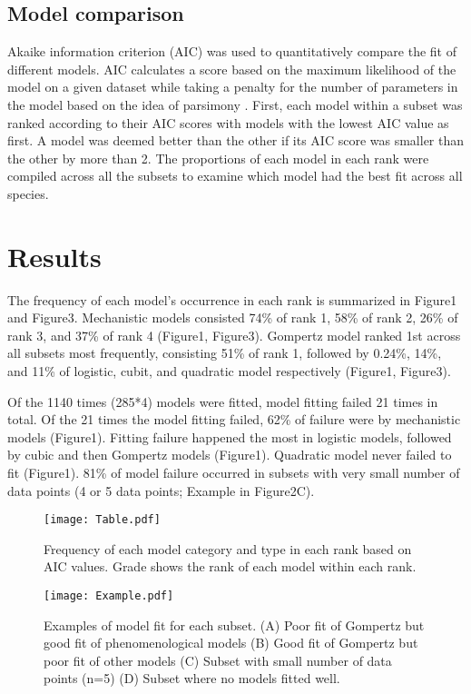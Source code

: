 \documentclass[11pt, a4paper]{article}
\begin{document}
\subsection{Model comparison}
Akaike information criterion (AIC) was used to quantitatively compare the fit of different models. AIC calculates a score based on the maximum likelihood of the model on a given dataset while taking a penalty for the number of parameters in the model based on the idea of parsimony \cite{Johnson2004}. First, each model within a subset was ranked according to their AIC scores with models with the lowest AIC value as first. A model was deemed better than the other if its AIC score  was smaller than the other by more than 2. The proportions of each model in each rank were compiled across all the subsets to examine which model had the best fit across all species. \par

\section{Results}
The frequency of each model’s occurrence in each rank is summarized in Figure1 and Figure3. Mechanistic models consisted 74\% of rank 1, 58\% of rank 2, 26\% of rank 3, and 37\% of rank 4 (Figure1, Figure3). Gompertz model ranked 1st across all subsets most frequently, consisting 51\% of rank 1, followed by 0.24\%, 14\%, and 11\% of logistic, cubit, and quadratic model respectively (Figure1, Figure3). \par

Of the 1140 times (285*4) models were fitted, model fitting failed 21 times in total. Of the 21 times the model fitting failed, 62\% of failure were by mechanistic models (Figure1). Fitting failure happened the most in logistic models, followed by cubic and then Gompertz models (Figure1). Quadratic model never failed to fit (Figure1). 81\% of model failure occurred in subsets with very small number of data points (4 or 5 data points; Example in Figure2C). \par

\begin{figure}[H]
\texttt{[image: Table.pdf]}
\caption{Frequency of each model category and type in each rank based on AIC values. Grade shows the rank of each model within each rank.} 
\end{figure}

\begin{figure}[H]
\texttt{[image: Example.pdf]}
\caption{Examples of model fit for each subset. (A) Poor fit of Gompertz but good fit of phenomenological models (B) Good fit of Gompertz but poor fit of other models (C) Subset with small number of data points (n=5) (D) Subset where no models fitted well.}
\end{figure}
\end{document}
